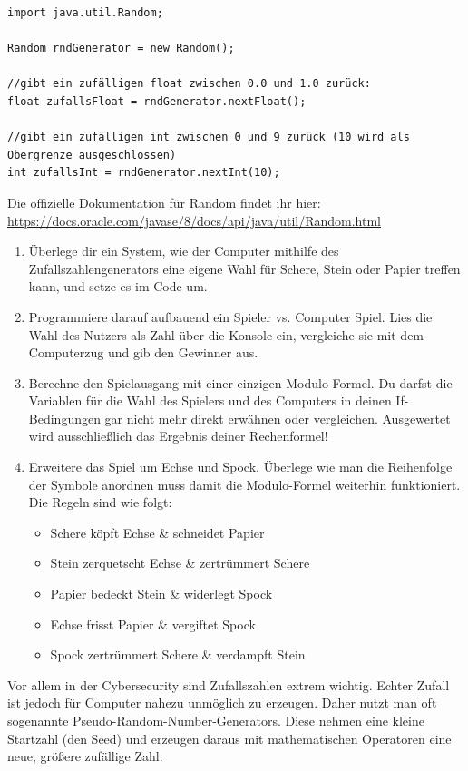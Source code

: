 \documentclass{../../sheet}
\begin{document}
\begin{verbatim}
import java.util.Random;

Random rndGenerator = new Random();

//gibt ein zufälligen float zwischen 0.0 und 1.0 zurück:
float zufallsFloat = rndGenerator.nextFloat();

//gibt ein zufälligen int zwischen 0 und 9 zurück (10 wird als Obergrenze ausgeschlossen)
int zufallsInt = rndGenerator.nextInt(10);
\end{verbatim}
Die offizielle Dokumentation für Random findet ihr hier: \url{https://docs.oracle.com/javase/8/docs/api/java/util/Random.html}
\begin{enumerate}
	\item Überlege dir ein System, wie der Computer mithilfe des Zufallszahlengenerators eine eigene Wahl für Schere, Stein oder Papier treffen kann, und setze es im Code um.
	\item Programmiere darauf aufbauend ein Spieler vs. Computer Spiel. Lies die Wahl des Nutzers als Zahl über die Konsole ein, vergleiche sie mit dem Computerzug und gib den Gewinner aus.
	\item Berechne den Spielausgang mit einer einzigen Modulo-Formel. Du darfst die Variablen für die Wahl des Spielers und des Computers in deinen If-Bedingungen gar nicht mehr direkt erwähnen oder vergleichen. Ausgewertet wird ausschließlich das Ergebnis deiner Rechenformel!
	\item Erweitere das Spiel um Echse und Spock. Überlege wie man die Reihenfolge der Symbole anordnen muss damit die Modulo-Formel weiterhin funktioniert. Die Regeln sind wie folgt:
	      \begin{itemize}
		      \item Schere köpft Echse \& schneidet Papier
		      \item Stein zerquetscht Echse \& zertrümmert Schere
		      \item Papier bedeckt Stein \& widerlegt Spock
		      \item Echse frisst Papier \& vergiftet Spock
		      \item Spock zertrümmert Schere \& verdampft Stein
	      \end{itemize}
\end{enumerate}


\newpage
{}
Vor allem in der Cybersecurity sind Zufallszahlen extrem wichtig. 
Echter Zufall ist jedoch für Computer nahezu unmöglich zu erzeugen. Daher nutzt man oft sogenannte Pseudo-Random-Number-Generators. Diese nehmen eine kleine Startzahl (den Seed) und erzeugen daraus mit mathematischen Operatoren eine neue, größere zufällige Zahl.
\end{document}
